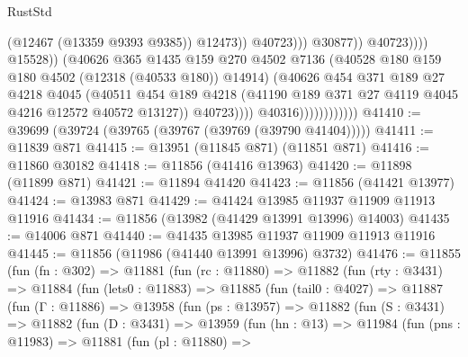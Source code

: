 \begin{lexlean}{RustStd}
\begin{coremodule}
                                                          (@12467 (@13359 @9393 @9385))
                                                          @12473))
                                                      @40723)))
                                                @30877))
                                            @40723))))
                                    @15528))
                                (@40626
                                  @365
                                  @1435
                                  @159
                                  @270
                                  @4502
                                  @7136
                                  (@40528 @180 @159 @180 @4502 (@12318 (@40533 @180)) @14914)
                                  (@40626
                                    @454
                                    @371
                                    @189
                                    @27
                                    @4218
                                    @4045
                                    (@40511
                                      @454
                                      @189
                                      @4218
                                      (@41190 @189 @371 @27 @4119 @4045 @4216 @12572 @40572 @13127))
                                    @40723))))
                            @40316))))))))))))
@41410 := @39699 (@39724 (@39765 (@39767 (@39769 (@39790 @41404)))))
@41411 := @11839 @871
@41415 := @13951 (@11845 @871) (@11851 @871)
@41416 := @11860 @30182
@41418 := @11856 (@41416 @13963)
@41420 := @11898 (@11899 @871)
@41421 := @11894 @41420
@41423 := @11856 (@41421 @13977)
@41424 := @13983 @871
@41429 := @41424 @13985 @11937 @11909 @11913 @11916
@41434 := @11856 (@13982 (@41429 @13991 @13996) @14003)
@41435 := @14006 @871
@41440 := @41435 @13985 @11937 @11909 @11913 @11916
@41445 := @11856 (@11986 (@41440 @13991 @13996) @3732)
@41476 := @11855
    (fun (fn : @302) =>
    @11881
      (fun (rc : @11880) =>
      @11882
        (fun (rty : @3431) =>
        @11884
          (fun (lets0 : @11883) =>
          @11885
            (fun (tail0 : @4027) =>
            @11887
              (fun (Γ : @11886) =>
              @13958
                (fun (ps : @13957) =>
                @11882
                  (fun (S : @3431) =>
                  @11882
                    (fun (D : @3431) =>
                    @13959
                      (fun (hn : @13) =>
                      @11984
                        (fun (pns : @11983) =>
                        @11881
                          (fun (pl : @11880) =>

\end{coremodule}
\end{lexlean}
